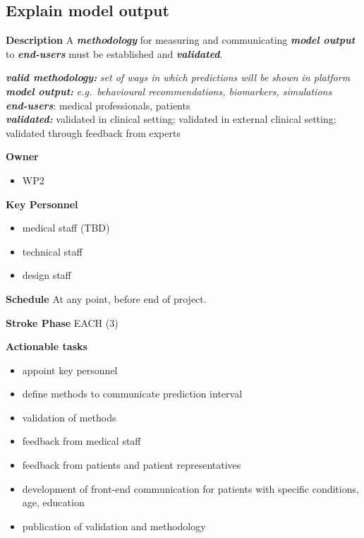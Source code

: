 \documentclass[
  letterpaper,
  DIV=11,
  numbers=noendperiod]{scrreport}
\providecommand{\tightlist}{%
  \setlength{\itemsep}{0pt}\setlength{\parskip}{0pt}}\usepackage{longtable,booktabs,array}
\begin{document}
\hypertarget{explain-model-output}{%
\subsection{Explain model output}\label{explain-model-output}}

\textbf{Description} A \textbf{\emph{methodology}} for measuring and
communicating \textbf{\emph{model output}} to \textbf{\emph{end-users}}
must be established and \textbf{\emph{validated}}.

\textbf{\emph{valid methodology:}} \emph{set of ways in which
predictions will be shown in platform}\\
\textbf{\emph{model output:}} \emph{e.g.~behavioural recommendations,
biomarkers, simulations}\\
\textbf{\emph{end-users}}: medical professionals, patients\\
\textbf{\emph{validated:}} validated in clinical setting; validated in
external clinical setting; validated through feedback from experts

\textbf{Owner}

\begin{itemize}
\tightlist
\item
  WP2
\end{itemize}

\textbf{Key Personnel}

\begin{itemize}
\tightlist
\item
  medical staff (TBD)
\item
  technical staff
\item
  design staff
\end{itemize}

\textbf{Schedule} At any point, before end of project.

\textbf{Stroke Phase} EACH (3)

\textbf{Actionable tasks}

\begin{itemize}
\tightlist
\item
  appoint key personnel
\item
  define methods to communicate prediction interval
\item
  validation of methods
\item
  feedback from medical staff
\item
  feedback from patients and patient representatives
\item
  development of front-end communication for patients with specific
  conditions, age, education
\item
  publication of validation and methodology
\end{itemize}
\end{document}
